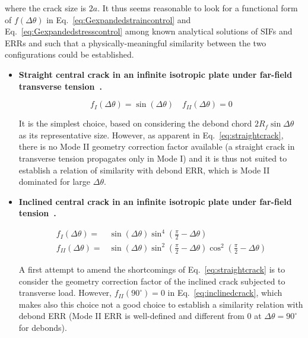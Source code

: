 \documentclass[a4paper,fleqn]{cas-dc}
\begin{document}
where the crack size is $2a$. It thus seems reasonable to look for a functional form of $f\left(\Delta\theta\right)$ in Eq.~\ref{eq:Gexpandedstraincontrol} and Eq.~\ref{eq:Gexpandedstresscontrol} among known analytical solutions of SIFs and ERRs and such that a physically-meaningful similarity between the two configurations could be established.

\begin{itemize}
\item \textbf{Straight central crack in an infinite isotropic plate under far-field transverse tension~\cite{Tada2000}.}

\begin{equation}\label{eq:straightcrack}
f_{I}\left(\Delta\theta\right)=\sin\left(\Delta\theta\right)\quad f_{II}\left(\Delta\theta\right)=0
\end{equation}

It is the simplest choice, based on considering the debond chord $2R_{f}\sin{\Delta\theta}$ as its representative size. However, as apparent in Eq.~\ref{eq:straightcrack}, there is no Mode II geometry correction factor available (a straight crack in transverse tension propagates only in Mode I) and it is thus not suited to establish a relation of similarity with debond ERR, which is Mode II dominated for large $\Delta\theta$.

\item \textbf{Inclined central crack in an infinite isotropic plate under far-field tension~\cite{Tada2000}.}

\begin{equation}\label{eq:inclinedcrack}
\begin{aligned}
f_{I}\left(\Delta\theta\right)=&\sin\left(\Delta\theta\right)\sin^{4}\left(\frac{\pi}{2}-\Delta\theta\right)\\ f_{II}\left(\Delta\theta\right)=&\sin\left(\Delta\theta\right)\sin^{2}\left(\frac{\pi}{2}-\Delta\theta\right)\cos^{2}\left(\frac{\pi}{2}-\Delta\theta\right)
\end{aligned}
\end{equation}

A first attempt to amend the shortcomings of Eq.~\ref{eq:straightcrack} is to consider the geometry correction factor of the inclined crack subjected to transverse load. However, $f_{II}\left(90^{\circ}\right)=0$ in Eq.~\ref{eq:inclinedcrack}, which makes also this choice not a good choice to establish a similarity relation with debond ERR (Mode II ERR is well-defined and different from $0$ at $\Delta\theta=90^{\circ}$ for debonds).


\end{itemize}
\end{document}
